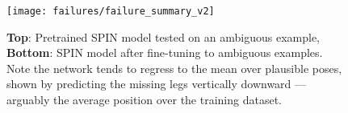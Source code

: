 \begin{figure}[t]
    \texttt{[image: failures/failure\_summary\_v2]} %
    \caption{
        \textbf{Top}: Pretrained SPIN model tested on an ambiguous example, \textbf{Bottom}: SPIN model after fine-tuning to ambiguous examples. Note the network tends to regress to the mean over plausible poses, shown by predicting the missing legs vertically downward --- arguably the average position over the training dataset.}\label{fig:issues}
\end{figure}
